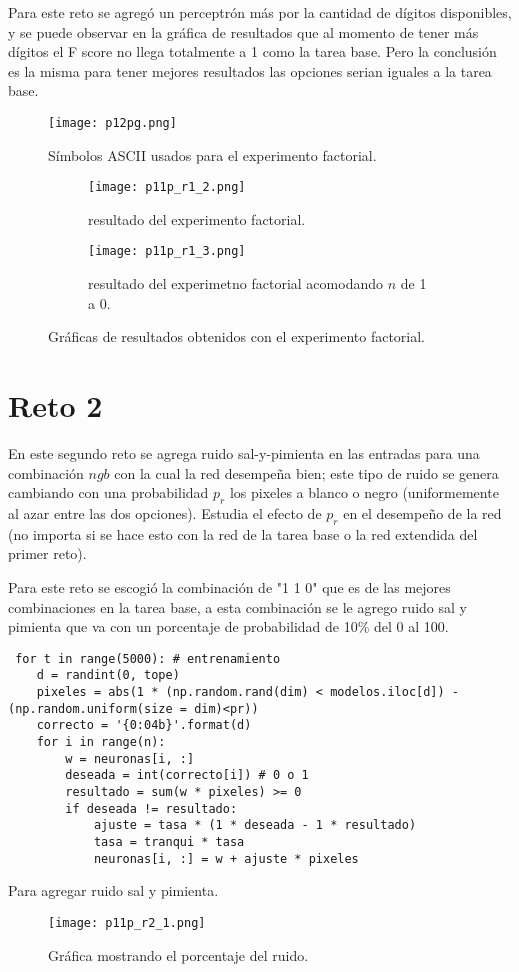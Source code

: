 \documentclass{article}
\begin{document}
Para este reto se agregó un perceptrón más por la cantidad de dígitos disponibles, y se puede observar en la gráfica de resultados que al momento de tener más dígitos el F score no llega totalmente a 1 como la tarea base. Pero la conclusión es la misma para tener mejores resultados las opciones serian iguales a la tarea base. 

\begin{figure}[H]
\centering
\texttt{[image: p12pg.png]}
\caption{\label{fig3} Símbolos ASCII usados para el experimento factorial.}
\end{figure}

\begin{figure}[H]
\centering
\begin{subfigure}[b]{0.40\linewidth}
\texttt{[image: p11p\_r1\_2.png]}
\caption{resultado del experimento factorial.}
\end{subfigure}
\begin{subfigure}[b]{0.40\linewidth}
\texttt{[image: p11p\_r1\_3.png]}
\caption{resultado del experimetno factorial acomodando $n$ de 1 a 0.}
\end{subfigure}
\caption{Gráficas de resultados obtenidos con el experimento factorial.}
\label{fig:westminster}
\end{figure}


\section{Reto 2}
En este segundo reto se agrega ruido sal-y-pimienta en las entradas para una combinación $ngb$ con la cual la red desempeña bien; este tipo de ruido se genera cambiando con una probabilidad $p_{r}$ los pixeles a blanco o negro (uniformemente al azar entre las dos opciones). Estudia el efecto de $p_{r}$ en el desempeño de la red (no importa si se hace esto con la red de la tarea base o la red extendida del primer reto).

Para este reto se escogió la combinación de "1 1 0" que es de las mejores combinaciones en la tarea base, a esta combinación se le agrego ruido sal y pimienta que va con un porcentaje de probabilidad de 10\% del 0 al 100.

\renewcommand{\listingscaption}{Código}
\begin{listing}[H]
  \begin{verbatim}
 for t in range(5000): # entrenamiento
    d = randint(0, tope)
    pixeles = abs(1 * (np.random.rand(dim) < modelos.iloc[d]) - (np.random.uniform(size = dim)<pr))
    correcto = '{0:04b}'.format(d)
    for i in range(n):
        w = neuronas[i, :]
        deseada = int(correcto[i]) # 0 o 1
        resultado = sum(w * pixeles) >= 0
        if deseada != resultado: 
            ajuste = tasa * (1 * deseada - 1 * resultado)
            tasa = tranqui * tasa 
            neuronas[i, :] = w + ajuste * pixeles
      \end{verbatim}
  \label{lst:fibo}
  \caption{Para agregar ruido sal y pimienta.}
\end{listing}

\begin{figure}[H]
\centering
\texttt{[image: p11p\_r2\_1.png]}
\caption{\label{fig3} Gráfica mostrando el porcentaje del ruido.}
\end{figure}

\printbibliography
\end{document}
